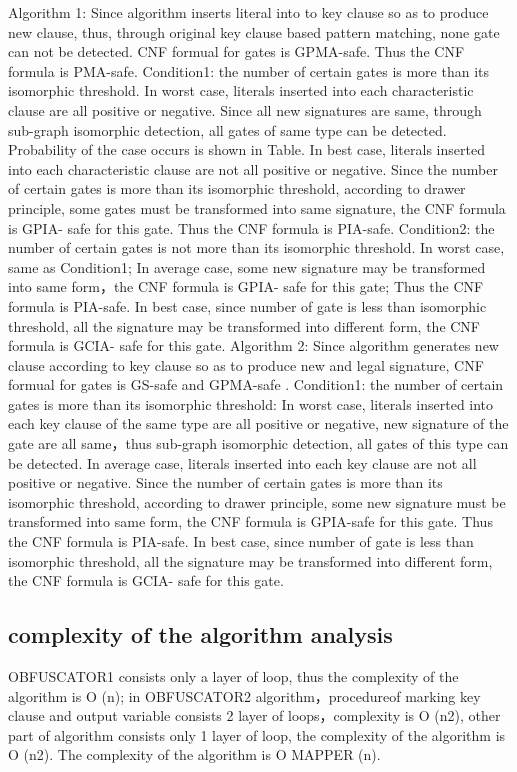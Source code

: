 \documentclass[runningheads,a4paper]{llncs}
\begin{document}
Algorithm 1:
    Since algorithm inserts literal into to key clause so as to produce new clause, thus, through original key clause based pattern matching, none gate can not be detected. CNF formual for gates is GPMA-safe. Thus the CNF formula is PMA-safe.
    Condition1: the number of certain gates is more than its isomorphic threshold.
In worst case, literals inserted into each characteristic clause are all positive or negative. Since all new signatures are same, through sub-graph isomorphic detection, all gates of same type can be detected. Probability of the case occurs is shown in Table.
In best case, literals inserted into each characteristic clause are not all positive or negative. Since the number of certain gates is more than its isomorphic threshold, according to drawer principle, some gates must be transformed into same signature, the CNF formula is GPIA- safe for this gate. Thus the CNF formula is PIA-safe.
   Condition2: the number of certain gates is not more than its isomorphic threshold.
In worst case, same as Condition1; In average case, some new signature may be transformed into same form，the CNF formula is GPIA- safe for this gate; Thus the CNF formula is PIA-safe. In best case, since number of gate is less than isomorphic threshold, all the signature may be transformed into different form, the CNF formula is GCIA- safe for this gate.
Algorithm 2:
    Since algorithm generates new clause according to key clause so as to produce new and legal signature, CNF formual for gates is GS-safe and GPMA-safe
.   Condition1: the number of certain gates is more than its isomorphic threshold:
	In worst case, literals inserted into each key clause of the same type are all positive or negative, new signature of the gate are all same，thus sub-graph isomorphic detection, all gates of this type can be detected.
	In average case, literals inserted into each key clause are not all positive or negative. Since the number of certain gates is more than its isomorphic threshold, according to drawer principle, some new signature must be transformed into same form, the CNF formula is GPIA-safe for this gate. Thus the CNF formula is PIA-safe. 
	In best case, since number of gate is less than isomorphic threshold, all the signature may be transformed into different form, the CNF formula is GCIA- safe for this gate.
\subsection{complexity of the algorithm analysis} 
OBFUSCATOR1 consists only a layer of loop, thus the complexity of the algorithm is O (n); in OBFUSCATOR2 algorithm，procedureof marking key clause and output variable consists 2 layer of loops，complexity is O (n2), other part of algorithm consists only 1 layer of loop, the complexity of the algorithm is O (n2). The complexity of the algorithm is O MAPPER (n).
\end{document}
